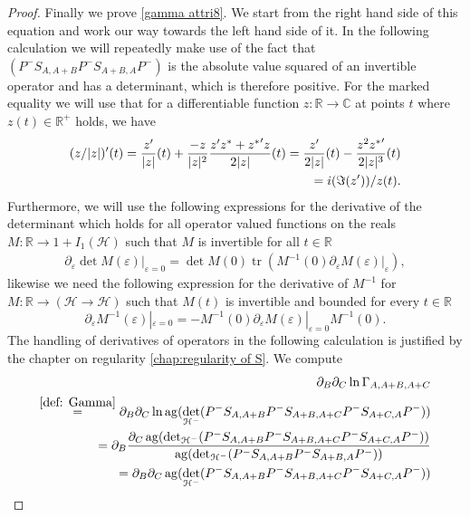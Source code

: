 \documentclass[b5paper,draft,openbib,12pt]{memoir}
\DeclareMathOperator{\tr}{tr}
\DeclareMathOperator{\ag}{ag}
\begin{document}
\begin{proof}
Finally we prove \eqref{gamma attri8}. We start from the right hand side of this equation 
and work our way towards the left hand side of it. In the following calculation we will repeatedly make use of the fact that 
\((P^-S_{A,A+B}P^-S_{A+B,A}P^- )\) is the absolute value squared of an invertible operator and has a determinant, which is therefore positive. 
For the marked equality we will use that for a differentiable function \(z:\mathbb{R}\rightarrow \mathbb{C}\) at points \(t\) where \(z(t)\in\mathbb{R}^+\)
holds, we have
\begin{align}\notag
(z/|z|)'(t)=\frac{z'}{|z|}(t)+\frac{-z}{|z|^2}\frac{z'z^*+ {z^*}'z}{2|z|}(t) =\frac{z'}{2|z|}(t)-\frac{z^2{z^*}'}{2 |z|^3}(t)\\
=i (\Im (z'))/z(t).
\end{align}
Furthermore, we will use the following  expressions for the derivative of 
the determinant which holds for all operator valued functions on the reals
\(M:\mathbb{R}\rightarrow 1+I_1(\mathcal{H})\) such that \(M\) is invertible 
for all \(t\in\mathbb{R}\)
\begin{align}\label{diff det}
\partial_\varepsilon \det M(\varepsilon)|_{\varepsilon=0}=\det M(0) \tr (M^{-1}(0)\partial_\varepsilon M(\varepsilon)|_{\varepsilon}),
\end{align}
likewise we need the following expression for the derivative of \(M^{-1}\) for 
\(M:\mathbb{R}\rightarrow (\mathcal{H}\rightarrow \mathcal{H})\) such that \(M(t)\) is invertible and bounded for every \(t\in\mathbb{R}\)
\begin{equation}
\partial_{\varepsilon}M^{-1}(\varepsilon)|_{\varepsilon=0}=-M^{-1}(0) \partial_{\varepsilon}M(\varepsilon)|_{\varepsilon=0}M^{-1}(0).
\end{equation}
The handling of derivatives of operators in the 
following calculation is justified by 
the chapter on regularity \ref{chap:regularity of S}. 
We compute
\begin{align}
\partial_B \partial_C \ln \Gamma_{A,A+B,A+C}\\
\overset{\eqref{def: Gamma}}{=} 
\partial_B \partial_C \ln \ag(\det_{\mathcal{H}^-} (P^-S_{A,A+B}P^-S_{A+B,A+C}P^- S_{A+C,A}P^-))\\
=\partial_B \frac{\partial_C\ag(\det_{\mathcal{H}^-}(P^-S_{A,A+B}P^-S_{A+B,A+C}P^- S_{A+C,A}P^-))}{\ag(\det_{\mathcal{H}^-} (P^-S_{A,A+B}P^-S_{A+B,A}P^- ))}\\
=\partial_B \partial_C\ag(\det_{\mathcal{H}^-}(P^-S_{A,A+B}P^-S_{A+B,A+C}P^- S_{A+C,A}P^-))\\

\end{align}
\end{proof}
\end{document}
